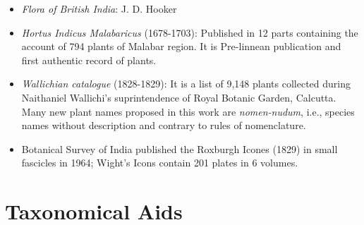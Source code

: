 \documentclass[
]{book}
\providecommand{\tightlist}{%
  \setlength{\itemsep}{0pt}\setlength{\parskip}{0pt}}
\begin{document}
\begin{itemize}
  \begin{itemize}
  \tightlist
  \item
    \emph{Flora of British India}: J. D. Hooker
  \item
    \emph{Hortus Indicus Malabaricus} (1678-1703): Published in 12 parts containing the account of 794 plants of Malabar region. It is Pre-linnean publication and first authentic record of plants.
  \item
    \emph{Wallichian catalogue} (1828-1829): It is a list of 9,148 plants collected during Naithaniel Wallichi's suprintendence of Royal Botanic Garden, Calcutta. Many new plant names proposed in this work are \emph{nomen-nudum}, i.e., species names without description and contrary to rules of nomenclature.
  \item
    Botanical Survey of India published the Roxburgh Icones (1829) in small fascicles in 1964; Wight's Icons contain 201 plates in 6 volumes.
  \end{itemize}
\end{itemize}

\hypertarget{taxonomical-aids}{%
\section{Taxonomical Aids}\label{taxonomical-aids}}
\end{document}
